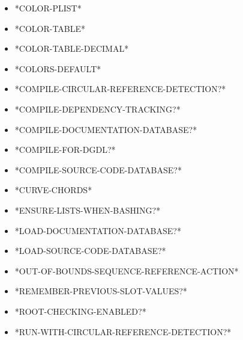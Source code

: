 \documentclass [11pt]{book}
\begin{document}
\begin{itemize}

\item {}*COLOR-PLIST*

\item {}*COLOR-TABLE*

\item {}*COLOR-TABLE-DECIMAL*

\item {}*COLORS-DEFAULT*

\item {}*COMPILE-CIRCULAR-REFERENCE-DETECTION?*

\item {}*COMPILE-DEPENDENCY-TRACKING?*

\item {}*COMPILE-DOCUMENTATION-DATABASE?*

\item {}*COMPILE-FOR-DGDL?*

\item {}*COMPILE-SOURCE-CODE-DATABASE?*

\item {}*CURVE-CHORDS*

\item {}*ENSURE-LISTS-WHEN-BASHING?*

\item {}*LOAD-DOCUMENTATION-DATABASE?*

\item {}*LOAD-SOURCE-CODE-DATABASE?*

\item {}*OUT-OF-BOUNDS-SEQUENCE-REFERENCE-ACTION*

\item {}*REMEMBER-PREVIOUS-SLOT-VALUES?*

\item {}*ROOT-CHECKING-ENABLED?*

\item {}*RUN-WITH-CIRCULAR-REFERENCE-DETECTION?*


\end{itemize}
\end{document}
